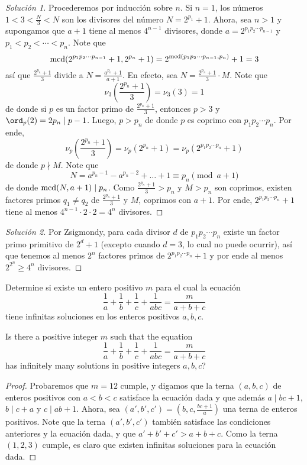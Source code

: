 \begin{proof}[Solución 1]
	Procederemos por inducción sobre $n$. Si $n=1$, los números $1<3<\frac{N}{3}<N$ son los divisores del número $N=2^{p_1}+1$. Ahora, sea $n>1$ y supongamos que $a+1$ tiene al menos $4^{n-1}$ divisores, donde $a=2^{p_1p_2\cdots p_{n-1}}$ y $p_1<p_2<\cdots<p_n$. Note que
	\[\operatorname{mcd}(2^{p_1p_2\cdots p_{n-1}}+1,2^{p_n}+1)=2^{\operatorname{mcd}(p_1p_2\cdots p_{n-1},p_n)}+1=3\]
	así que $\frac{2^{p_n}+1}{3}$ divide a $N=\frac{a^{p_n}+1}{a+1}$. En efecto, sea $N=\frac{2^{p_n}+1}{3}\cdot M$. Note que
	\[\nu_3\left(\frac{2^{p_n}+1}{3}\right)=\nu_3(3)=1\]
	de donde si $p$ es un factor primo de $\frac{2^{p_n}+1}{3}$, entonces $p>3$ y $\ord_p(2)=2p_n\mid p-1$. Luego, $p>p_n$ de donde $p$ es coprimo con $p_1p_2\cdots p_n$. Por ende,
	\[\nu_p\left(\frac{2^{p_n}+1}{3}\right)=\nu_p(2^{p_n}+1)=\nu_p(2^{p_1p_2\cdots p_n}+1)\]
	de donde $p\nmid M$. Note que
	\[N=a^{p_n-1}-a^{p_n-2}+\dots+1\equiv p_n\pmod{a+1}\]
	de donde $\operatorname{mcd}(N,a+1)\mid p_n$. Como $\frac{2^{p_n}+1}{3}>p_n$ y $M>p_n$ son coprimos, existen factores primos $q_1\ne q_2$ de $\frac{2^{p_n}+1}{3}$ y $M$, coprimos con $a+1$. Por ende, $2^{p_1p_2\cdots p_n}+1$ tiene al menos $4^{n-1}\cdot 2\cdot 2=4^n$ divisores.
\end{proof}

\begin{proof}[Solución 2]
	Por Zsigmondy, para cada divisor $d$ de $p_1p_2\cdots p_n$ existe un factor primo primitivo de $2^d+1$ (excepto cuando $d=3$, lo cual no puede ocurrir), así que tenemos al menos $2^n$ factores primos de $2^{p_1p_2\cdots p_n}+1$ y por ende al menos $2^{2^n}\ge 4^n$ divisores.
\end{proof}


\begin{probEG}[ISL 2002/N4]
	Determine si existe un entero positivo $m$ para el cual la ecuación
	\[\frac1a+\frac1b+\frac1c+\frac{1}{abc}=\frac{m}{a+b+c}\]
	tiene infinitas soluciones en los enteros positivos $a,b,c$.
	\begin{hint}
		Is there a positive integer $m$ such that the equation
		\[\frac1a+\frac1b+\frac1c+\frac{1}{abc}=\frac{m}{a+b+c}\]
		has infinitely many solutions in positive integers $a,b,c$?
	\end{hint}
\end{probEG}

\begin{proof}
	Probaremos que $m=12$ cumple, y digamos que la terna $(a,b,c)$ de enteros positivos con $a<b<c$ satisface la ecuación dada y que además $a\mid bc+1$, $b\mid c+a$ y $c\mid ab+1$. Ahora, sea $(a',b',c')=\left(b,c,\frac{bc+1}{a}\right)$ una terna de enteros positivos. Note que la terna $(a',b',c')$ también satisface las condiciones anteriores y la ecuación dada, y que $a'+b'+c'>a+b+c$. Como la terna $(1,2,3)$ cumple, es claro que existen infinitas soluciones para la ecuación dada.
\end{proof}

